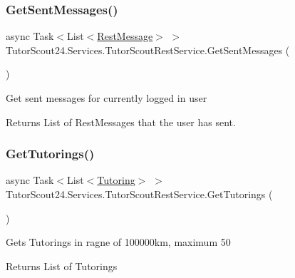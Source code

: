 \subsubsection{\texorpdfstring{Get\+Sent\+Messages()}{GetSentMessages()}}
{\footnotesize\ttfamily async Task$<$List$<$\mbox{\hyperlink{class_tutor_scout24_1_1_models_1_1_chat_1_1_rest_message}{Rest\+Message}}$>$ $>$ Tutor\+Scout24.\+Services.\+Tutor\+Scout\+Rest\+Service.\+Get\+Sent\+Messages (\begin{DoxyParamCaption}{ }\end{DoxyParamCaption})\hspace{0.3cm}{\ttfamily [inline]}}



Get sent messages for currently logged in user 

\begin{DoxyReturn}{Returns}
List of Rest\+Messages that the user has sent.
\end{DoxyReturn}
\mbox{\label{class_tutor_scout24_1_1_services_1_1_tutor_scout_rest_service_a6324b2d5d4b9a9fe5dd7592417e8917c}} 
\subsubsection{\texorpdfstring{Get\+Tutorings()}{GetTutorings()}}
{\footnotesize\ttfamily async Task$<$List$<$\mbox{\hyperlink{class_tutor_scout24_1_1_models_1_1_tutorings_1_1_tutoring}{Tutoring}}$>$ $>$ Tutor\+Scout24.\+Services.\+Tutor\+Scout\+Rest\+Service.\+Get\+Tutorings (\begin{DoxyParamCaption}{ }\end{DoxyParamCaption})\hspace{0.3cm}{\ttfamily [inline]}}



Gets Tutorings in ragne of 100000km, maximum 50 

\begin{DoxyReturn}{Returns}
List of Tutorings
\end{DoxyReturn}
\mbox{\label{class_tutor_scout24_1_1_services_1_1_tutor_scout_rest_service_a0a9cee645967c8be7d723b29778fafae}} 
